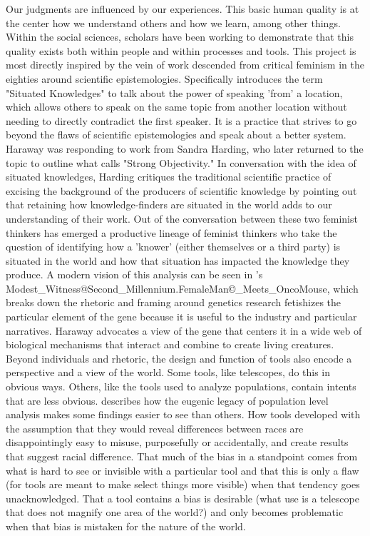 \documentclass[a4paper,man,natbib]{apa6}
\begin{document}
   Our judgments are influenced by our experiences. This basic human quality is at the center how we understand others and how we learn, among other things. Within the social sciences, scholars have been working to demonstrate that this quality exists both within people and within processes and tools. This project is most directly inspired by the vein of work descended from critical feminism in the eighties around scientific epistemologies. Specifically \citet{Haraway1988-nh} introduces the term "Situated Knowledges" to talk about the power of speaking 'from' a location, which allows others to speak on the same topic from another location without needing to directly contradict the first speaker. It is a practice that strives to go beyond the flaws of scientific epistemologies and speak about a better system. Haraway was responding to work from Sandra Harding, who later returned to the topic to outline what \citet{Harding1992-od} calls "Strong Objectivity." In conversation with the idea of situated knowledges, Harding critiques the traditional scientific practice of excising the background of the producers of scientific knowledge by pointing out that retaining how knowledge-finders are situated in the world adds to our understanding of their work. Out of the conversation between these two feminist thinkers has emerged a productive lineage of feminist thinkers who take the question of identifying how a 'knower' (either themselves or a third party) is situated in the world and how that situation has impacted the knowledge they produce. A modern vision of this analysis can be seen in \citet{Harraway1997-va}'s Modest\_Witness@Second\_Millennium.FemaleMan\copyright\_Meets\_OncoMouse\texttrademark, which breaks down the rhetoric and framing around genetics research fetishizes the particular element of the gene because it is useful to the industry and particular narratives. Haraway advocates a view of the gene that centers it in a wide web of biological mechanisms that interact and combine to create living creatures. Beyond individuals and rhetoric, the design and function of tools also encode a perspective and a view of the world. Some tools, like telescopes, do this in obvious ways. Others, like the tools used to analyze populations, contain intents that are less obvious. \citet{Subramaniam2014-wg} describes how the eugenic legacy of population level analysis makes some findings easier to see than others. How tools developed with the assumption that they would reveal differences between races are disappointingly easy to misuse, purposefully or accidentally, and create results that suggest racial difference. That much of the bias in a standpoint comes from what is hard to see or invisible with a particular tool and that this is only a flaw (for tools are meant to make select things more visible) when that tendency goes unacknowledged. That a tool contains a bias is desirable (what use is a telescope that does not magnify one area of the world?) and only becomes problematic when that bias is mistaken for the nature of the world.
\end{document}
